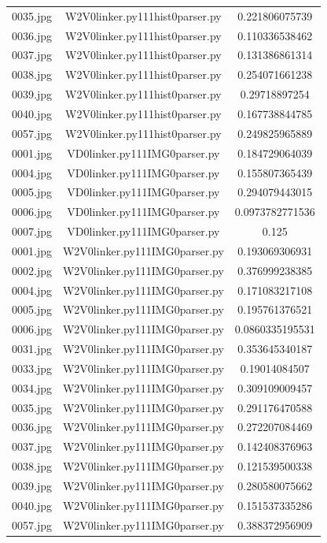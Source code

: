 \documentclass[a4paper,10pt]{article}
\begin{document}
\begin{table}[htbp]
\begin{tabular}{|c|c|c|}
0035.jpg&W2V0linker.py111hist0parser.py&0.221806075739\\
0036.jpg&W2V0linker.py111hist0parser.py&0.110336538462\\
0037.jpg&W2V0linker.py111hist0parser.py&0.131386861314\\
0038.jpg&W2V0linker.py111hist0parser.py&0.254071661238\\
0039.jpg&W2V0linker.py111hist0parser.py&0.29718897254\\
0040.jpg&W2V0linker.py111hist0parser.py&0.167738844785\\
0057.jpg&W2V0linker.py111hist0parser.py&0.249825965889\\
0001.jpg&VD0linker.py111IMG0parser.py&0.184729064039\\
0004.jpg&VD0linker.py111IMG0parser.py&0.155807365439\\
0005.jpg&VD0linker.py111IMG0parser.py&0.294079443015\\
0006.jpg&VD0linker.py111IMG0parser.py&0.0973782771536\\
0007.jpg&VD0linker.py111IMG0parser.py&0.125\\
0001.jpg&W2V0linker.py111IMG0parser.py&0.193069306931\\
0002.jpg&W2V0linker.py111IMG0parser.py&0.376999238385\\
0004.jpg&W2V0linker.py111IMG0parser.py&0.171083217108\\
0005.jpg&W2V0linker.py111IMG0parser.py&0.195761376521\\
0006.jpg&W2V0linker.py111IMG0parser.py&0.0860335195531\\
0031.jpg&W2V0linker.py111IMG0parser.py&0.353645340187\\
0033.jpg&W2V0linker.py111IMG0parser.py&0.19014084507\\
0034.jpg&W2V0linker.py111IMG0parser.py&0.309109009457\\
0035.jpg&W2V0linker.py111IMG0parser.py&0.291176470588\\
0036.jpg&W2V0linker.py111IMG0parser.py&0.272207084469\\
0037.jpg&W2V0linker.py111IMG0parser.py&0.142408376963\\
0038.jpg&W2V0linker.py111IMG0parser.py&0.121539500338\\
0039.jpg&W2V0linker.py111IMG0parser.py&0.280580075662\\
0040.jpg&W2V0linker.py111IMG0parser.py&0.151537335286\\
0057.jpg&W2V0linker.py111IMG0parser.py&0.388372956909\\

				\hline
				\end{tabular}
				\end{table}
				 
\end{document}

